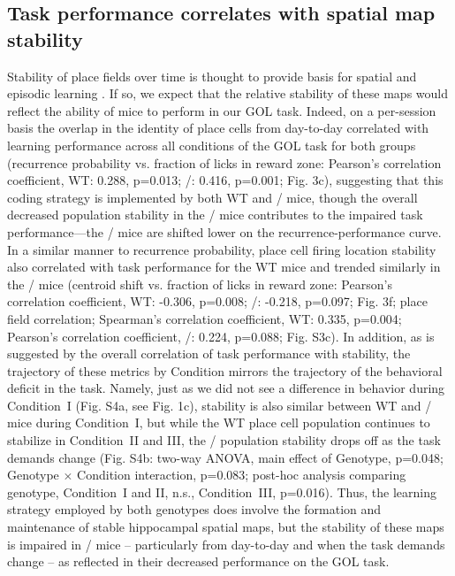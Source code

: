 \subsection{Task performance correlates with spatial map stability}

Stability of place fields over time is thought to provide basis for spatial and episodic learning \citep{Kentros2004, Mankin2012, Thompson1990, Ziv2013}. If so, we expect that the relative stability of these maps would reflect the ability of mice to perform in our GOL task. Indeed, on a per-session basis the overlap in the identity of place cells from day-to-day correlated with learning performance across all conditions of the GOL task for both groups (recurrence probability vs. fraction of licks in reward zone: Pearson's correlation coefficient, WT: 0.288, p=0.013; \df/: 0.416, p=0.001; Fig. 3c), suggesting that this coding strategy is implemented by both WT and \df/ mice, though the overall decreased population stability in the \df/ mice contributes to the impaired task performance—the \df/  mice are shifted lower on the recurrence-performance curve. In a similar manner to recurrence probability, place cell firing location stability also correlated with task performance for the WT mice and trended similarly in the \df/ mice (centroid shift vs. fraction of licks in reward zone: Pearson's correlation coefficient, WT: -0.306, p=0.008; \df/: -0.218, p=0.097; Fig. 3f; place field correlation; Spearman's correlation coefficient, WT: 0.335, p=0.004; Pearson's correlation coefficient, \df/: 0.224, p=0.088; Fig. S3c). In addition, as is suggested by the overall correlation of task performance with stability, the trajectory of these metrics by Condition mirrors the trajectory of the behavioral deficit in the task. Namely, just as we did not see a difference in behavior during Condition~I (Fig. S4a, see Fig. 1c), stability is also similar between WT and \df/  mice during Condition~I, but while the WT place cell population continues to stabilize in Condition~II and III, the \df/ population stability drops off as the task demands change (Fig. S4b: two-way ANOVA, main effect of Genotype, p=0.048; Genotype $\times$ Condition interaction, p=0.083; post-hoc analysis comparing genotype, Condition~I and II, n.s., Condition~III, p=0.016). Thus, the learning strategy employed by both genotypes does involve the formation and maintenance of stable hippocampal spatial maps, but the stability of these maps is impaired in \df/ mice -- particularly from day-to-day and when the task demands change -- as reflected in their decreased performance on the GOL task.

